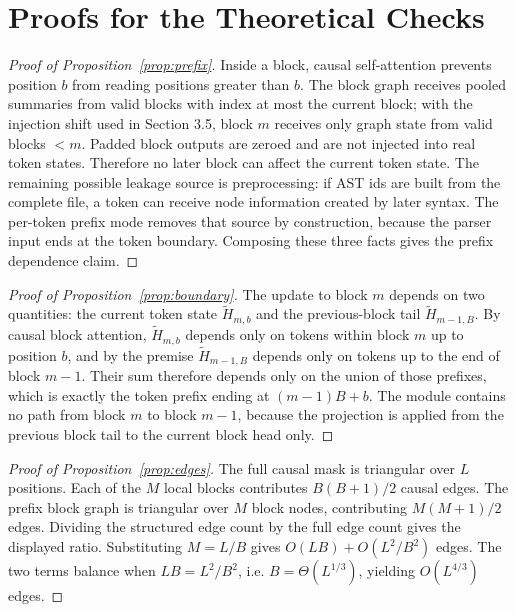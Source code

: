 \documentclass[10pt]{article}
\begin{document}



\appendix

\section{Proofs for the Theoretical Checks}
\label{app:proofs}

\begin{proof}[Proof of Proposition~\ref{prop:prefix}]
Inside a block, causal self-attention prevents position $b$ from reading
positions greater than $b$.  The block graph receives pooled summaries from
valid blocks with index at most the current block; with the injection shift used
in Section 3.5, block $m$ receives only graph state from valid blocks $<m$.
Padded block outputs are zeroed and are not injected into real token states.
Therefore no later block can affect the current token state.  The remaining possible leakage
source is preprocessing: if AST ids are built from the complete file, a token can
receive node information created by later syntax.  The per-token prefix mode
removes that source by construction, because the parser input ends at the token
boundary.  Composing these three facts gives the prefix dependence claim.
\end{proof}

\begin{proof}[Proof of Proposition~\ref{prop:boundary}]
The update to block $m$ depends on two quantities: the current token state
$\tilde H_{m,b}$ and the previous-block tail $\tilde H_{m-1,B}$.  By causal
block attention, $\tilde H_{m,b}$ depends only on tokens within block $m$ up to
position $b$, and by the premise $\tilde H_{m-1,B}$ depends only on tokens up to
the end of block $m-1$.  Their sum therefore depends only on the union of those
prefixes, which is exactly the token prefix ending at $(m-1)B+b$.  The module
contains no path from block $m$ to block $m-1$, because the projection is applied
from the previous block tail to the current block head only.
\end{proof}

\begin{proof}[Proof of Proposition~\ref{prop:edges}]
The full causal mask is triangular over $L$ positions.  Each of the $M$ local
blocks contributes $B(B+1)/2$ causal edges.  The prefix block graph is triangular
over $M$ block nodes, contributing $M(M+1)/2$ edges.  Dividing the structured
edge count by the full edge count gives the displayed ratio.  Substituting
$M=L/B$ gives $O(LB)+O(L^2/B^2)$ edges.  The two terms balance when
$LB=L^2/B^2$, i.e. $B=\Theta(L^{1/3})$, yielding $O(L^{4/3})$ edges.
\end{proof}
\end{document}

